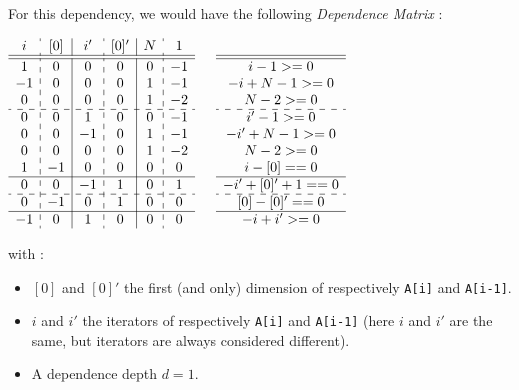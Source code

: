 \documentclass[paper=a4, fontsize=11.5pt]{scrartcl}
\numberwithin{equation}{section}        %
\numberwithin{figure}{section}          %
\numberwithin{table}{section}               %
\begin{document}
        For this dependency, we would have the following \textit{Dependence Matrix} :
\begin{center}
$
        \begin{array}{c:c|c:c|c:c}
        i &    [0] & i' &   [0]' &  N &  1 \\ \hline \hline
        1 &    0 &   0 &    0 &   0 &  -1 \\
        -1 &    0 &   0 &    0 &   1 &  -1 \\
        0 &    0 &   0 &    0 &   1 &  -2 \\ \hdashline
        0 &    0 &   1 &    0 &   0 &  -1 \\
        0 &    0 &  -1 &    0 &   1 &  -1 \\
        0 &    0 &   0 &    0 &   1 &  -2 \\
        1 &   -1 &   0 &    0 &   0 &   0 \\ \hline
        0 &    0 &  -1 &    1 &   0 &   1 \\ \hdashline
        0 &   -1 &   0 &    1 &   0 &   0 \\ \hline
        -1 &    0 &   1 &    0 &   0 &   0 \\
        \end{array}
        \qquad
        \begin{matrix}
                \\ \hline \hline
        {i-1 >= 0} \\
        {-i+N-1 >= 0} \\
        {N-2 >= 0} \\ \hdashline
        {i'-1 >= 0} \\
        {-i'+N-1 >= 0} \\
        {N-2 >= 0}  \\
        {i-[0] == 0}\\ \hline
        {-i'+[0]'+1 == 0} \\ \hdashline
        {[0] - [0]' == 0}  \\ \hline
        {-i+i' >= 0} \\
        \end{matrix}
$
\end{center}
    with :
    \begin{itemize}
        \item $[0]$ and $[0]'$ the first (and only) dimension of respectively \verb'A[i]' and
            \verb'A[i-1]'.
        \item $i$ and $i'$ the iterators of respectively \verb'A[i]' and \verb'A[i-1]'
            (here $i$ and $i'$ are the same, but iterators are always considered different).
        \item A dependence depth $d = 1$.
    \end{itemize}
    
\end{document}

